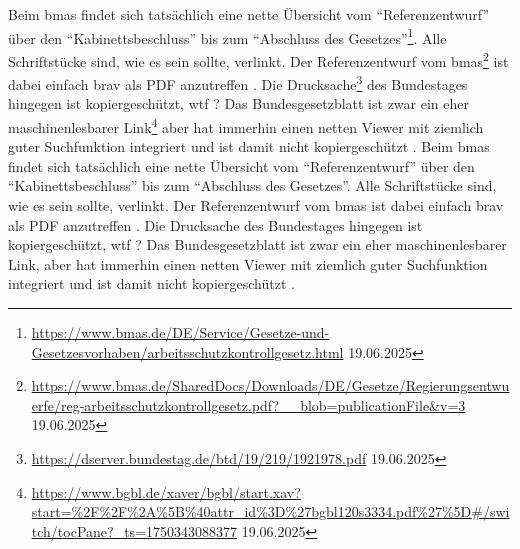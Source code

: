 Beim \gls{bmas} findet sich tatsächlich eine nette Übersicht vom \enquote{Referenzentwurf} über den \enquote{Kabinettsbeschluss} bis zum \enquote{Abschluss des Gesetzes}\footnote{
    \url{https://www.bmas.de/DE/Service/Gesetze-und-Gesetzesvorhaben/arbeitsschutzkontrollgesetz.html} 19.06.2025
}. 
Alle Schriftstücke sind, wie es sein sollte, verlinkt. Der Referenzentwurf vom \gls{bmas}\footnote{
    \url{https://www.bmas.de/SharedDocs/Downloads/DE/Gesetze/Regierungsentwuerfe/reg-arbeitsschutzkontrollgesetz.pdf?__blob=publicationFile&v=3} 19.06.2025
} ist dabei einfach brav als PDF anzutreffen \autocite{BMAS-21.07.2020}. 
Die Drucksache\footnote{
    \url{https://dserver.bundestag.de/btd/19/219/1921978.pdf} 19.06.2025
} des Bundestages hingegen ist kopiergeschützt, wtf \autocite{Bundestag.31.08.2020}?
Das Bundesgesetzblatt ist zwar ein eher maschinenlesbarer Link\footnote{
    \url{https://www.bgbl.de/xaver/bgbl/start.xav?start=%2F%2F%2A%5B%40attr_id%3D%27bgbl120s3334.pdf%27%5D#/switch/tocPane?_ts=1750343088377} 19.06.2025
} aber hat immerhin einen netten Viewer mit ziemlich guter Suchfunktion integriert und ist damit nicht kopiergeschützt \autocite{BGBl.2020-I-Nr67}. 
Beim \gls{bmas} findet sich tatsächlich eine nette Übersicht vom \enquote{Referenzentwurf} über den \enquote{Kabinettsbeschluss} bis zum \enquote{Abschluss des Gesetzes}.
Alle Schriftstücke sind, wie es sein sollte, verlinkt. Der Referenzentwurf vom \gls{bmas} ist dabei einfach brav als PDF anzutreffen \autocite{BMAS-21.07.2020}. 
Die Drucksache des Bundestages hingegen ist kopiergeschützt, wtf \autocite{Bundestag.31.08.2020}?
Das Bundesgesetzblatt ist zwar ein eher maschinenlesbarer Link, aber hat immerhin einen netten Viewer mit ziemlich guter Suchfunktion integriert und ist damit nicht kopiergeschützt \autocite{BGBl.2020-I-Nr67}. 



